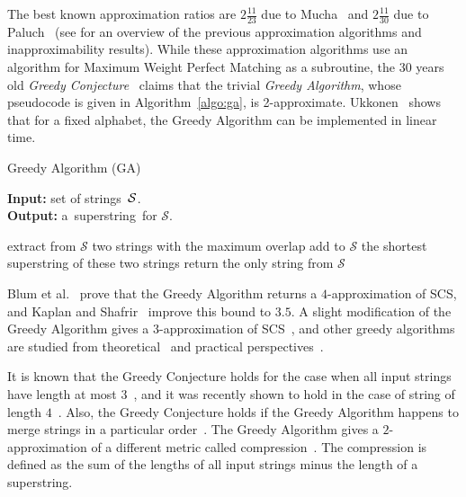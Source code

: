 \documentclass[11pt]{article}
\begin{document}
The best known approximation ratios are $2\frac{11}{23}$ due to Mucha~\cite{M2013} and $2\frac{11}{30}$ due to Paluch~\cite{P14} (see \cite[Section~2.1]{GKM13} for an overview of the 
previous approximation algorithms
and inapproximability results). While these approximation algorithms use an algorithm for Maximum Weight Perfect Matching as a subroutine, the $30$ years old \emph{Greedy Conjecture}~\cite{storer1987data, TU1988, T1989, BJLTY1991} claims that the trivial \emph{Greedy Algorithm}, whose pseudocode is given in Algorithm~\ref{algo:ga}, is 2-approximate. Ukkonen~\cite{ukkonen1990linear} shows that for a fixed alphabet, the Greedy Algorithm can be implemented in linear time.

\begin{algorithm}[ht]
\label{algo:ga}
\caption{Greedy Algorithm (GA)}
\hspace*{\algorithmicindent} \textbf{Input:} set of strings~${\cal S}$.\\
\hspace*{\algorithmicindent} \textbf{Output:} a~superstring~for $\mathcal{S}$.
\begin{algorithmic}[1]
\State extract from $\mathcal{S}$ two strings with the maximum overlap
\State add to $\mathcal{S}$ the shortest superstring of these two strings
\EndWhile
\State return the only string from $\mathcal{S}$
\end{algorithmic}
\end{algorithm}


Blum et al.~\cite{BJLTY1991} prove that the Greedy Algorithm returns a $4$-approximation of SCS, and Kaplan and Shafrir~\cite{KS2005} improve this bound to $3.5$. A slight modification of the Greedy Algorithm gives a $3$-approximation of SCS~\cite{BJLTY1991}, and other greedy algorithms are studied from theoretical~\cite{BJLTY1991,rivals2018superstrings} and practical perspectives~\cite{romero2004experimental, cazaux2018practical}.

It is known that the Greedy Conjecture holds for the case when all input strings have length at most $3$~\cite{TU1988, cazaux20143}, and it was recently shown to hold in the case of string of length $4$~\cite{kulikov2015greedy}. Also, the Greedy Conjecture holds if the Greedy Algorithm happens to merge strings in a particular order~\cite{weinard2006greedy, laube2005conditional}. The Greedy Algorithm gives a $2$-approximation of a different metric called compression~\cite{TU1988}. The compression is defined as the sum of the lengths of all input strings minus the length of a superstring.
\end{document}
